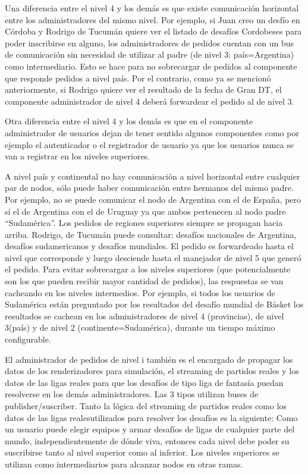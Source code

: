 Una diferencia entre el nivel 4 y los demás es que existe comunicación horizontal entre los administradores del mismo nivel. Por ejemplo, si Juan creo un desfío en Córdoba y Rodrigo de Tucumán quiere ver el listado de desafíos Cordobeses para poder inscribirse en alguno, los administradores de pedidos cuentan con un bus de comunicación sin necesidad de utilizar
al padre (de nivel 3: país=Argentina) como intermediario. Esto se hace para no sobrecargar de pedidos al componente
que responde pedidos a nivel país. Por el contrario, como ya se mencionó anteriormente, si Rodrigo quiere ver el resultado de la fecha de Gran DT, el componente administrador de nivel 4 deberá forwardear el pedido al de nivel 3.

Otra diferencia entre el nivel 4 y los demás es que en el componente administrador de usuarios dejan de tener sentido algunos componentes como por ejemplo el autenticador o el registrador de usuario ya que los usuarios nunca se van a registrar en los niveles superiores.

A nivel país y continental no hay comunicación a nivel horizontal entre cualquier par de nodos, sólo puede haber comunicación entre hermanos del mismo padre. Por ejemplo, no se puede comunicar el nodo de Argentina con el de España, pero sí el de Argentina con el de Uruguay ya que ambos pertenecen al nodo padre ``Sudamérica''. Los pedidos de regiones superiores siempre se propagan hacia arriba. Rodrigo, de Tucumán puede consultar: desafíos nacionales de Argentina, desafíos sudamericanos y desafíos mundiales. El pedido es forwardeado hasta el nivel que corresponde y luego desciende hasta el
manejador de nivel 5 que generó el pedido. Para evitar sobrecargar a los niveles superiores (que potencialmente son los que pueden recibir mayor cantidad de pedidos), las respuestas se van cacheando en los niveles intermedios. Por ejemplo,
si todos los usuarios de Sudamérica están preguntado por los resultados del desafío mundial de Básket los resultados
se cachean en los administradores de nivel 4 (provincias), de nivel 3(país) y de nivel 2 (continente=Sudamérica), durante un tiempo máximo configurable.


El administrador de pedidos de nivel i también es el encargado de propagar los datos de los renderizadores para simulación, el streaming de partidos reales y los datos de las ligas reales para que los desafíos de tipo liga de fantasía puedan resolverse
en los demás administradores.
Las 3 tipos utilizan buses de publisher/suscriber.
Tanto la lógica del streaming de partidos reales como los datos de las ligas realesutilizados para resolver los desafíos es la siguiente: Como un usuario puede elegir equipos y armar desafíos de ligas de cualquier parte del mundo, independientemente de dónde viva, entonces cada nivel debe poder su suscribirse tanto al nivel superior como al inferior. Los niveles superiores se utilizan como intermediarios para alcanzar nodos en otras ramas.

